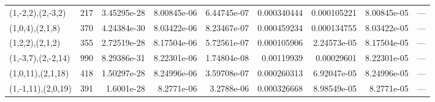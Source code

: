 \begin{tabular}{lrrrrrrrl}
 (1,-2,2),(2,-3,2)  &    217 & 3.45295e-28 & 8.00845e-06 & 6.44745e-07 &    0.000340444 &  0.000105221 & 8.00845e-05 & ---    \\
 (1,0,4),(2,1,8)    &    370 & 4.24384e-30 & 8.03422e-06 & 8.23467e-07 &    0.000459234 &  0.000134755 & 8.03422e-05 & ---    \\
 (1,2,2),(2,1,2)    &    355 & 2.72519e-28 & 8.17504e-06 & 5.72561e-07 &    0.000105906 &  2.24573e-05 & 8.17504e-05 & ---    \\
 (1,-3,7),(2,-2,14) &    990 & 8.29386e-31 & 8.22301e-06 & 1.74804e-08 &    0.00119939  &  0.00029601  & 8.22301e-05 & ---    \\
 (1,0,11),(2,1,18)  &    418 & 1.50297e-28 & 8.24996e-06 & 3.59708e-07 &    0.000260313 &  6.92047e-05 & 8.24996e-05 & ---    \\
 (1,-1,11),(2,0,19) &    391 & 1.6001e-28  & 8.2771e-06  & 3.2788e-06  &    0.000326668 &  8.98549e-05 & 8.2771e-05  & ---    \\
\hline
\end{tabular}